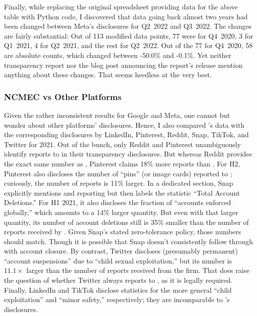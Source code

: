 Finally, while replacing the original spreadsheet providing data for the above
table with Python code, I discovered that data going back almost two years had
been changed between Meta's disclosures for Q2~2022 and Q3~2022. The changes are
fairly substantial: Out of 113 modified data points, 77 were for Q4~2020, 3 for
Q1~2021, 4 for Q2~2021, and the rest for Q2~2022. Out of the 77 for Q4~2020, 58
are absolute counts, which changed between -50.0\% and -0.1\%. Yet neither
transparency report nor the blog post announcing the report's release mention
anything about these changes. That seems heedless at the very best.


\subsubsection{NCMEC vs Other Platforms}

Given the rather inconsistent results for Google and Meta, one cannot but wonder
about other platforms' disclosures. Hence, I also compared 's data with
the corresponding disclosures by LinkedIn, Pinterest, Reddit, Snap, TikTok, and
Twitter for 2021. Out of the bunch, only Reddit and Pinterest unambiguously
identify  reports to  in their transparency disclosures. But
whereas Reddit provides the exact same number as , Pinterest claims 18\%
more reports than . For H2, Pinterest also discloses the number of
``pins'' (or image cards) reported to ; curiously, the number of reports
is 11\% larger. In a dedicated section, Snap explicitly mentions  and
 reporting but then labels the statistic ``Total Account Deletions.'' For
H1 2021, it also discloses the fraction of ``accounts enforced globally,'' which
amounts to a 14\% larger quantity. But even with that larger quantity, its
number of account deletions still is 35\% smaller than the number of reports
received by . Given Snap's stated zero-tolerance policy, those numbers
should match. Though it is possible that Snap doesn't consistently follow
through with account closure. By contrast, Twitter discloses (presumably
permanent) ``account suspensions'' due to ``child sexual exploitation,'' but its
number is $11.1\times$ larger than the number of reports 
received from the firm. That does raise the question of whether Twitter always
reports  to , as it is legally required. Finally, LinkedIn and
TikTok disclose statistics for the more general ``child exploitation'' and
``minor safety,'' respectively; they are incomparable to 's disclosures.

